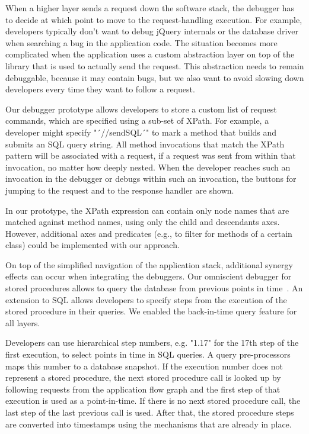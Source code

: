 \documentclass[
      english,
			conference,
      ]{IEEEtran}
\begin{document}
When a higher layer sends a request down the software stack, the debugger has to decide at which point to move to the request-handling execution.
For example, developers typically don't want to debug jQuery internals or the database driver when searching a bug in the application code.
The situation becomes more complicated when the application uses a custom abstraction layer on top of the library that is used to actually send the request.
This abstraction needs to remain debuggable, because it may contain bugs, but we also want to avoid slowing down developers every time they want to follow a request.

Our debugger prototype allows developers to store a custom list of request commands, which are specified using a sub-set of XPath.
For example, a developer might specify "´//sendSQL´" to mark a method that builds and submits an SQL query string.
All method invocations that match the XPath pattern will be associated with a request, if a request was sent from within that invocation, no matter how deeply nested.
When the developer reaches such an invocation in the debugger or debugs within such an invocation, the buttons for jumping to the request and to the response handler are shown.

In our prototype, the XPath expression can contain only node names that are matched against method names, using only the child and descendants axes.
However, additional axes and predicates (e.g., to filter for methods of a certain class) could be implemented with our approach.

On top of the simplified navigation of the application stack, additional synergy effects can occur when integrating the debuggers.
Our omniscient debugger for stored procedures allows to query the database from previous points in time~\cite{treffer2017bringing}.
An extension to SQL allows developers to specify steps from the execution of the stored procedure in their queries.
We enabled the back-in-time query feature for all layers.

Developers can use hierarchical step numbers, e.g. "1.17" for the 17th step of the first execution, to select points in time in SQL queries.
A query pre-processors maps this number to a database snapshot.
If the execution number does not represent a stored procedure, the next stored procedure call is looked up by following requests from the application flow graph and the first step of that execution is used as a point-in-time.
If there is no next stored procedure call, the last step of the last previous call is used.
After that, the stored procedure steps are converted into timestamps using the mechanisms that are already in place.
\end{document}
